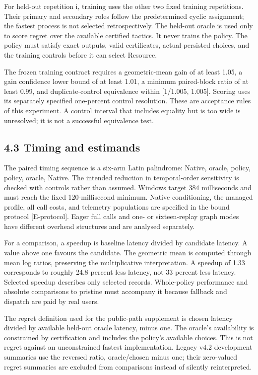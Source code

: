 \documentclass[11pt,a4paper]{article}
\begin{document}
For held-out repetition i, training uses the other two fixed training repetitions. Their primary and secondary roles follow the predetermined cyclic assignment; the fastest process is not selected retrospectively. The held-out oracle is used only to score regret over the available certified tactics. It never trains the policy. The policy must satisfy exact outputs, valid certificates, actual persisted choices, and the training controls before it can select Resource.


The frozen training contract requires a geometric-mean gain of at least 1.05, a gain confidence lower bound of at least 1.01, a minimum paired-block ratio of at least 0.99, and duplicate-control equivalence within [1/\allowbreak{}1.005, 1.005]. Scoring uses its separately specified one-percent control resolution. These are acceptance rules of this experiment. A control interval that includes equality but is too wide is unresolved; it is not a successful equivalence test.


\subsection*{4.3 Timing and estimands}

The paired timing sequence is a six-arm Latin palindrome: Native, oracle, policy, policy, oracle, Native. The intended reduction in temporal-order sensitivity is checked with controls rather than assumed. Windows target 384 milliseconds and must reach the fixed 120-millisecond minimum. Native conditioning, the managed profile, all call costs, and telemetry populations are specified in the bound protocol [E-protocol]. Eager full calls and one- or sixteen-replay graph modes have different overhead structures and are analysed separately.


For a comparison, a speedup is baseline latency divided by candidate latency. A value above one favours the candidate. The geometric mean is computed through mean log ratios, preserving the multiplicative interpretation. A speedup of 1.33 corresponds to roughly 24.8 percent less latency, not 33 percent less latency. Selected speedup describes only selected records. Whole-policy performance and absolute comparisons to pristine must accompany it because fallback and dispatch are paid by real users.


The regret definition used for the public-path supplement is chosen latency divided by available held-out oracle latency, minus one. The oracle's availability is constrained by certification and includes the policy's available choices. This is not regret against an unconstrained fastest implementation. Legacy v4.2 development summaries use the reversed ratio, oracle/\allowbreak{}chosen minus one; their zero-valued regret summaries are excluded from comparisons instead of silently reinterpreted.
\end{document}
